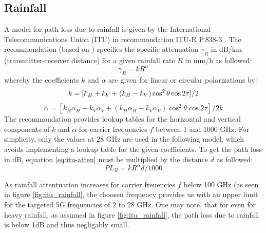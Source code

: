 \subsection{Rainfall}
A model for path loss due to rainfall is given by the International Telecommunications Union
(ITU) in recommondation ITU-R P.838-3 \cite{itu838-3}. The recommondation (based on \cite{liebe1993propagation}) 
specifies the specific 
attenuation $\gamma_R$ in dB/km (transmitter-receiver distance) for a given rainfall rate $R$ 
in mm/h as followed: 
\begin{equation} \label{eq:itu-atten}
    \gamma_R = k R^{\alpha}
\end{equation}
whereby the coefficients $k$ and $\alpha$ are given for linear or circular polarizations by: 
\begin{equation}
    k = [ k_H + k_V + ( k_H - k_V ) \cos^2 \theta \cos 2 \tau ] / 2 \\
\end{equation}
\begin{equation}
    \alpha = [ k_H \alpha_H + k_V \alpha_V + ( k_H \alpha_H - k_V \alpha_V) \cos^2 \theta \cos 2 \tau ] / 2 k
\end{equation}
The recommondation provides lookup tables for the horizontal and vertical components of $k$ and $\alpha$ 
for carrier frequencies $f$ between 1 and 1000 GHz. For simplicity, only the values at 28 GHz
are used in the following model, which avoids implementing a lookup table for the given coefficients.
To get the path loss in dB, equation \ref{eq:itu-atten} must be multiplied by the distance $d$ as followed: 
\begin{equation} \label{itu-pl}
    PL_R = k R^{\alpha} d / 1000
\end{equation}

As rainfall attentuation increases for carrier freuencies $f$ below 100 GHz (as seen in figure \ref{fig:itu_rainfall}, 
the choosen frequency provides us with an upper limit for the targeted 5G frequencies of 2 to 28 GHz.
One may note, that for even for heavy rainfall, as assumed in figure \ref{fig:itu_rainfall}, the path loss
due to rainfall is below 1dB and thus negligably small.

